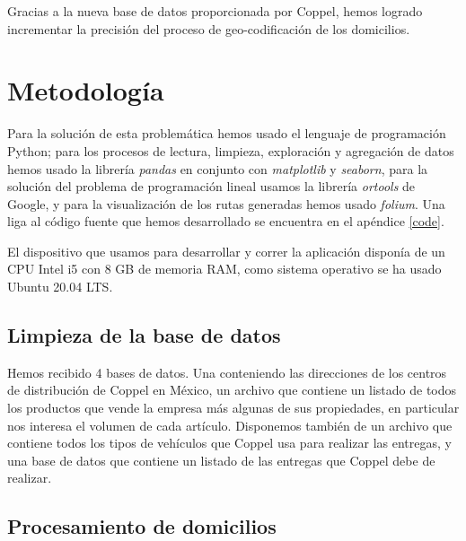 \documentclass[journal]{IEEEtran}                                                          %
\begin{document}
        Gracias a la nueva base de datos proporcionada por Coppel, hemos logrado incrementar la precisión del proceso de geo-codificación de los domicilios.
        
    
    \section{Metodología}
    
        Para la solución de esta problemática hemos usado el lenguaje de programación Python; para los procesos de lectura, limpieza, exploración y agregación de datos hemos usado la librería \emph{pandas} en conjunto con \emph{matplotlib} y \emph{seaborn}, para la solución del problema de programación lineal usamos la librería \emph{ortools} de Google, y para la visualización de los rutas generadas hemos usado \emph{folium}. Una liga al código fuente que hemos desarrollado se encuentra en el apéndice \ref{code}.
        
        El dispositivo que usamos para desarrollar y correr la aplicación disponía de un CPU Intel i5 con 8 GB de memoria RAM, como sistema operativo se ha usado Ubuntu 20.04 LTS.
    
        \subsection{Limpieza de la base de datos} \label{stage 1}
            
            Hemos recibido 4 bases de datos. Una conteniendo las direcciones de los centros de distribución de Coppel en México, un archivo que contiene un listado de todos los productos que vende la empresa más algunas de sus propiedades, en particular nos interesa el volumen de cada artículo. Disponemos también de un archivo que contiene todos los tipos de vehículos que Coppel usa para realizar las entregas, y una base de datos que contiene un listado de las entregas que Coppel debe de realizar.
            
        \subsection{Procesamiento de domicilios} \label{stage 2}
        
\end{document}

